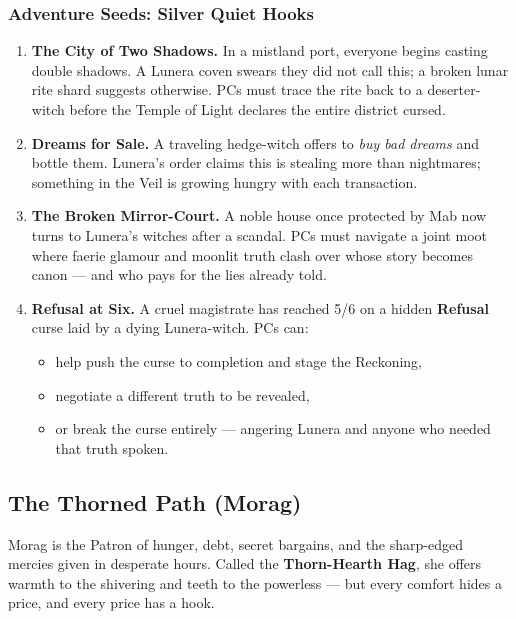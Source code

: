 \documentclass[11pt]{book}
\begin{document}
\subsubsection{Adventure Seeds: Silver Quiet Hooks}

\begin{enumerate}[leftmargin=*]
  \item \textbf{The City of Two Shadows.} In a mistland port, everyone begins casting double shadows. A Lunera coven swears they did not call this; a broken lunar rite shard suggests otherwise. PCs must trace the rite back to a deserter-witch before the Temple of Light declares the entire district cursed.
  \item \textbf{Dreams for Sale.} A traveling hedge-witch offers to \emph{buy bad dreams} and bottle them. Lunera's order claims this is stealing more than nightmares; something in the Veil is growing hungry with each transaction.
  \item \textbf{The Broken Mirror-Court.} A noble house once protected by Mab now turns to Lunera's witches after a scandal. PCs must navigate a joint moot where faerie glamour and moonlit truth clash over whose story becomes canon --- and who pays for the lies already told.
  \item \textbf{Refusal at Six.} A cruel magistrate has reached 5/6 on a hidden \textbf{Refusal} curse laid by a dying Lunera-witch. PCs can:
  \begin{itemize}[leftmargin=*]
    \item help push the curse to completion and stage the Reckoning,
    \item negotiate a different truth to be revealed,
    \item or break the curse entirely --- angering Lunera and anyone who needed that truth spoken.
  \end{itemize}
\end{enumerate}

\subsection{The Thorned Path (Morag)}

Morag is the Patron of hunger, debt, secret bargains, and the sharp-edged mercies given in desperate hours. Called the \textbf{Thorn-Hearth Hag}, she offers warmth to the shivering and teeth to the powerless --- but every comfort hides a price, and every price has a hook.
\end{document}
